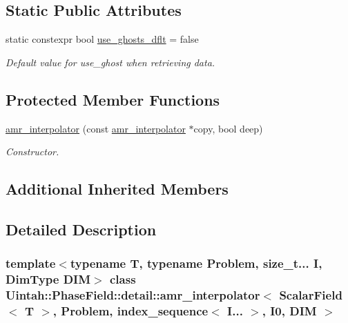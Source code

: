 \subsection*{Static Public Attributes}
\begin{DoxyCompactItemize}
\item 
static constexpr bool \hyperlink{classUintah_1_1PhaseField_1_1detail_1_1amr__interpolator_3_01ScalarField_3_01T_01_4_00_01Problem64f2458f98b03e27672a091eecc4b696_a659b258bc11df07830b73859f57dee78}{use\+\_\+ghosts\+\_\+dflt} = false
\begin{DoxyCompactList}\small\item\em Default value for use\+\_\+ghost when retrieving data. \end{DoxyCompactList}\end{DoxyCompactItemize}
\subsection*{Protected Member Functions}
\begin{DoxyCompactItemize}
\item 
\hyperlink{classUintah_1_1PhaseField_1_1detail_1_1amr__interpolator_3_01ScalarField_3_01T_01_4_00_01Problem64f2458f98b03e27672a091eecc4b696_a2ac98ad421a41cc7a2780cb09a95539f}{amr\+\_\+interpolator} (const \hyperlink{classUintah_1_1PhaseField_1_1detail_1_1amr__interpolator}{amr\+\_\+interpolator} $\ast$copy, bool deep)
\begin{DoxyCompactList}\small\item\em Constructor. \end{DoxyCompactList}\end{DoxyCompactItemize}
\subsection*{Additional Inherited Members}


\subsection{Detailed Description}
\subsubsection*{template$<$typename T, typename Problem, size\+\_\+t... I, Dim\+Type D\+IM$>$\newline
class Uintah\+::\+Phase\+Field\+::detail\+::amr\+\_\+interpolator$<$ Scalar\+Field$<$ T $>$, Problem, index\+\_\+sequence$<$ I... $>$, I0, D\+I\+M $>$}

